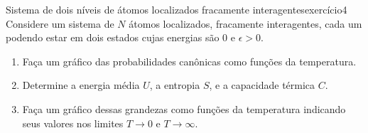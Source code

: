 \begin{exercício}{Sistema de dois níveis de átomos localizados fracamente interagentes}{exercício4}
    Considere um sistema de \(N\) átomos localizados, fracamente interagentes, cada um podendo estar em dois estados cujas energias são \(0\) e \(\epsilon > 0\).
    \begin{enumerate}[label=(\alph*)]
        \item Faça um gráfico das probabilidades canônicas como funções da temperatura.
    \item Determine a energia média \(U\), a entropia \(S\), e a capacidade térmica \(C\).
        \item Faça um gráfico dessas grandezas como funções da temperatura indicando seus valores nos limites \(T \to 0\) e \(T \to \infty\).
    \end{enumerate}
\end{exercício}

